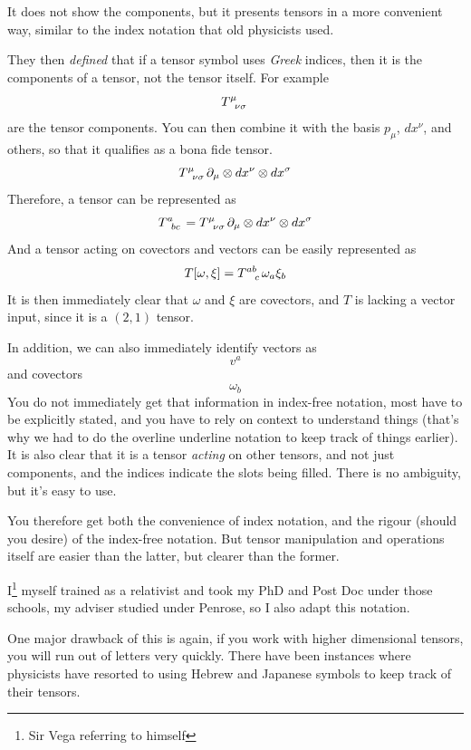 \begin{enumerate}[(1)]
			It does not show the components, but it presents tensors in a more convenient way, similar 
			to the index notation that old physicists used.

			They then \textit{defined} that if a tensor symbol uses \textit{Greek} indices, then
			it is the components of a tensor, not the tensor itself. For example
			\[
				\tensor{T}{^\mu_{\nu\sigma}}
			\]
			are the tensor components. You can then combine it with the basis $p_\mu$, $dx^\nu$, and 
			others, so that it qualifies as a bona fide tensor.
			\[
				\tensor{T}{^\mu_{\nu\sigma}}\p_\mu \otimes dx^\nu \otimes dx^\sigma
			\]
			Therefore, a tensor can be represented as 
			\[
				\tensor{T}{^{a}_{bc}}
				=
				\tensor{T}{^\mu_{\nu\sigma}}\p_\mu\otimes dx^\nu\otimes dx^\sigma
			\]
			And a tensor acting on covectors and vectors can be easily represented as 
			\[
				T[\omega,\xi]=
				\tensor{T}{^{ab}_c}\omega_a \xi_b
			\]
			It is then immediately clear that $\omega$ and $\xi$ are covectors, and $T$ is
			lacking a vector input, since it is a $(2,1)$ tensor. 

			In addition, we can also immediately identify vectors as 
			\[
				v^a
			\]
			and covectors
			\[
				\omega_b
			\]
			You do not immediately
			get that information in index-free notation, most have to be explicitly stated, and you
			have to rely on context to understand things (that's why we had to do the overline underline notation to keep track of things earlier). It is also clear that it is a tensor \textit{acting} on other tensors,
			and not just components, and the indices indicate the slots being filled. 
			There is no ambiguity, but it's easy to use. 

			You therefore get both the convenience
			of index notation, and the rigour (should you desire) of the index-free notation.
			But tensor manipulation and operations itself are easier than the latter, but clearer than the former.

			I\footnote{Sir Vega referring to himself} myself trained 
			as a relativist and took my PhD and Post Doc under those schools, my adviser studied
			under Penrose, so I also adapt this notation.

			One major drawback of this is again, if you work with higher dimensional tensors,
			you will run out of letters very quickly. There have been instances where physicists 
			have resorted to using Hebrew and Japanese symbols to keep track of their tensors.
	\end{enumerate}

